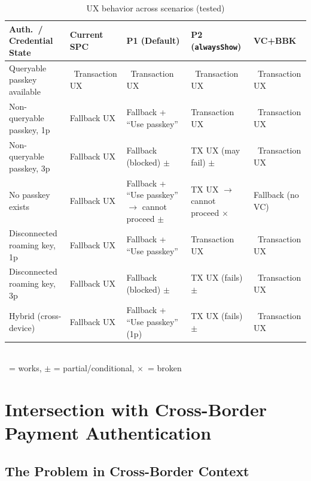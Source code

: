 \documentclass[12pt,a4paper]{article}
\newcommand{\yes}{\textcolor{green!70!black}{\checkmark}}
\newcommand{\no}{\textcolor{red!70!black}{$\times$}}
\begin{document}
\begin{table}[H]
\centering
\caption{UX behavior across scenarios (tested)}
\label{tab:ux-matrix}
\scriptsize
\begin{tabularx}{\textwidth}{>{\raggedright\arraybackslash}p{2.8cm}>{\raggedright\arraybackslash}X>{\raggedright\arraybackslash}X>{\raggedright\arraybackslash}X>{\raggedright\arraybackslash}X}
\toprule
\textbf{Auth.\ / Credential State} & \textbf{Current SPC} & \textbf{P1 (Default)} & \textbf{P2 (\texttt{alwaysShow})} & \textbf{VC+BBK} \\
\midrule
Queryable passkey available & \yes\ Transaction UX & \yes\ Transaction UX & \yes\ Transaction UX & \yes\ Transaction UX \\
Non-queryable passkey, 1p & Fallback UX & Fallback + ``Use passkey'' \yes & Transaction UX \yes & \yes\ Transaction UX \\
Non-queryable passkey, 3p & Fallback UX & Fallback (blocked) $\pm$ & TX UX (may fail) $\pm$ & \yes\ Transaction UX \\
No passkey exists & Fallback UX & Fallback + ``Use passkey'' $\to$ cannot proceed $\pm$ & TX UX $\to$ cannot proceed \no & Fallback (no VC) \\
Disconnected roaming key, 1p & Fallback UX & Fallback + ``Use passkey'' \yes & Transaction UX \yes & \yes\ Transaction UX \\
Disconnected roaming key, 3p & Fallback UX & Fallback (blocked) $\pm$ & TX UX (fails) $\pm$ & \yes\ Transaction UX \\
Hybrid (cross-device) & Fallback UX & Fallback + ``Use passkey'' (1p) \yes & TX UX (fails) $\pm$ & \yes\ Transaction UX \\
\bottomrule
\end{tabularx}
\\[4pt]
\footnotesize \yes\ = works, $\pm$ = partial/conditional, \no\ = broken
\end{table}

\newpage
\section{Intersection with Cross-Border Payment Authentication}

\subsection{The Problem in Cross-Border Context}
\end{document}
